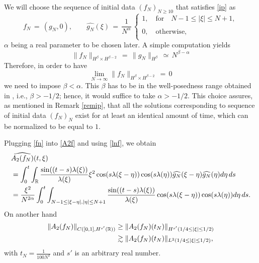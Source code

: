 \documentclass{amsart}
\begin{document}
We will choose the sequence of initial data $(f_N)_{N\geq 10}$ that satisfies \eqref{ip} as
\begin{equation}
f_N\,=\,(g_N, 0), \qquad \widehat{g_N}(\xi)\,=\,\frac{1}{N^\alpha}\,\left\{
\begin{array}{l}
1,\quad \text{for} \quad N-1\leq |\xi| \leq N+1,\\
\\
0,\quad \text{otherwise},\\
\end{array}\right.
\label{fn}
\end{equation}
$\alpha$ being a real parameter to be chosen later. A simple computation yields
\begin{equation}
\|f_N\|_{H^\beta\times H^{\beta-2}}\,=\,\|g_N\|_{H^\beta}\,\simeq\,N^{\beta-\alpha}
\label{hsfn}
\end{equation}
Therefore, in order to have 
\[
\lim_{N\to \infty} \|f_N\|_{H^\beta \times H^{\beta -2}}\,=\,0
\]
we need to impose $\beta<\alpha$. This $\beta$ has to be in the well-posedness range obtained in \cite{Kishimoto:2010ly}, i.e., $\beta>-1/2$; hence, it would suffice to take $\alpha >-1/2$. This choice assures, as mentioned in Remark \ref{remip}, that all the solutions corresponding to sequence of initial data $(f_N)_N$ exist for at least an identical amount of time, which can be normalized to be equal to $1$. 

Plugging \eqref{fn} into \eqref{A2f} and using \eqref{lnf}, we obtain
\begin{equation}
\aligned
&\widehat{A_2(f_N)}(t,\xi)\\
&=\int_0^t \int_{\mathbb{R}} \frac{\sin((t-s) \lambda(\xi))}{\lambda(\xi)} \xi^2 \cos(s \lambda(\xi-\eta))\cos(s\lambda(\eta))\widehat{g_N}(\xi-\eta)\widehat{g_N}(\eta)d\eta\,ds\\
&=\frac{\xi^2}{N^{2\alpha}}\int_0^t \int_{N-1\leq |\xi-\eta|, |\eta| \leq N+1}\frac{\sin((t-s) \lambda(\xi))}{\lambda(\xi)}\cos(s \lambda(\xi-\eta))\cos(s\lambda(\eta))d\eta\,ds.\endaligned
\label{A2fn}
\end{equation}
On another hand
\begin{equation}
\aligned
\|A_2(f_N)\|_{C([0,1], H^{s'}(\mathbb{R}))} &\geq \|A_2(f_N)(t_N)\|_{H^{s'}(1/4\leq |\xi| \leq 1/2)}\\ &\gtrsim \|A_2(f_N)(t_N)\|_{L^2(1/4\leq |\xi| \leq 1/2)},\label{hsA2}
\endaligned
\end{equation}
with $t_N=\frac{1}{100 N^2}$ and $s'$ is an arbitrary real number.
\end{document}
